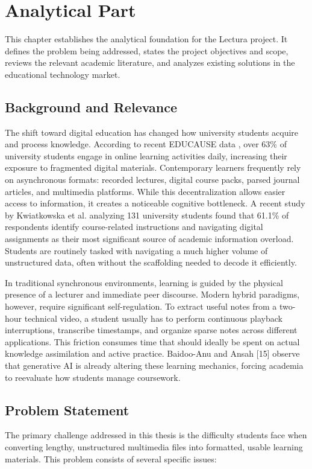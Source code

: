 \chapter{Analytical Part}
\label{chap:analytical}

This chapter establishes the analytical foundation for the Lectura project. It defines the problem being addressed, states the project objectives and scope, reviews the relevant academic literature, and analyzes existing solutions in the educational technology market.

\section{Background and Relevance}
The shift toward digital education has changed how university students acquire and process knowledge. According to recent EDUCAUSE data \cite{educause2022students}, over 63\% of university students engage in online learning activities daily, increasing their exposure to fragmented digital materials. Contemporary learners frequently rely on asynchronous formats: recorded lectures, digital course packs, parsed journal articles, and multimedia platforms. While this decentralization allows easier access to information, it creates a noticeable cognitive bottleneck. A recent study by Kwiatkowska et al. \cite{kwiatkowska2023information} analyzing 131 university students found that 61.1\% of respondents identify course-related instructions and navigating digital assignments as their most significant source of academic information overload. Students are routinely tasked with navigating a much higher volume of unstructured data, often without the scaffolding needed to decode it efficiently.

In traditional synchronous environments, learning is guided by the physical presence of a lecturer and immediate peer discourse. Modern hybrid paradigms, however, require significant self-regulation. To extract useful notes from a two-hour technical video, a student usually has to perform continuous playback interruptions, transcribe timestamps, and organize sparse notes across different applications. This friction consumes time that should ideally be spent on actual knowledge assimilation and active practice. Baidoo-Anu and Ansah [15] observe that generative AI is already altering these learning mechanics, forcing academia to reevaluate how students manage coursework. 

\section{Problem Statement}
The primary challenge addressed in this thesis is the difficulty students face when converting lengthy, unstructured multimedia files into formatted, usable learning materials. This problem consists of several specific issues:

